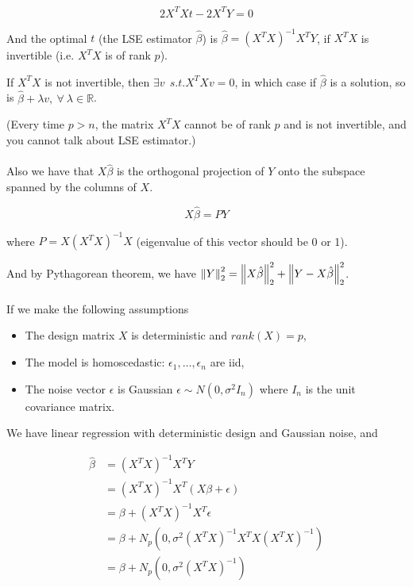 \documentclass{article}
\begin{document}
$$
2 X^T X t - 2 X^T Y = 0
$$

And the optimal $t$ (the LSE estimator $\hat{\beta}$) is $\hat{\beta} = (X^T X)^{-1} X^T Y$, if $X^T X$ is invertible (i.e. $X^T X$ is of rank $p$).

If $X^T X$ is not invertible, then $\exists v~~s.t. X^T X v = 0$, in which case if $\hat{\beta}$ is a solution, so is $\hat{\beta} + \lambda v, ~\forall~\lambda \in \mathbb{R}$.

(Every time $p > n$, the matrix $X^T X$ cannot be of rank $p$ and is not invertible, and you cannot talk about LSE estimator.)
\\
\\
Also we have that $X \hat{\beta}$ is the orthogonal projection of $Y$ onto the subspace spanned by the columns of $X$.

$$
X \hat{\beta} = P Y
$$

where $P = X (X^T X)^{-1} X$ (eigenvalue of this vector should be 0 or 1).

And by Pythagorean theorem, we have $\norm{Y}^2_2 = \norm{X \hat{\beta}}^2_2 + \norm{Y - X \hat{\beta}}^2_2$.
\\
\\

If we make the following assumptions
\begin{itemize}
  \item The design matrix $X$ is deterministic and $rank(X) = p$,
  \item The model is homoscedastic: $\epsilon_1, \dots, \epsilon_n$ are iid,
  \item The noise vector $\epsilon$ is Gaussian $\epsilon \sim \mathit{N}(0, \sigma^2 I_n)$ where $I_n$ is the unit covariance matrix.
\end{itemize}

We have linear regression with deterministic design and Gaussian noise, and

\begin{align*}
\hat{\beta} &= (X^T X)^{-1} X^T Y \\
            &= (X^T X)^{-1} X^T (X \beta + \epsilon) \\
            &= \beta + (X^T X)^{-1} X^T \epsilon \\
            &= \beta + \mathit{N}_p(0, \sigma^2 (X^T X)^{-1} X^T X (X^T X)^{-1}) \\
            &= \beta + \mathit{N}_p(0, \sigma^2 (X^T X)^{-1})
\end{align*}
\end{document}
